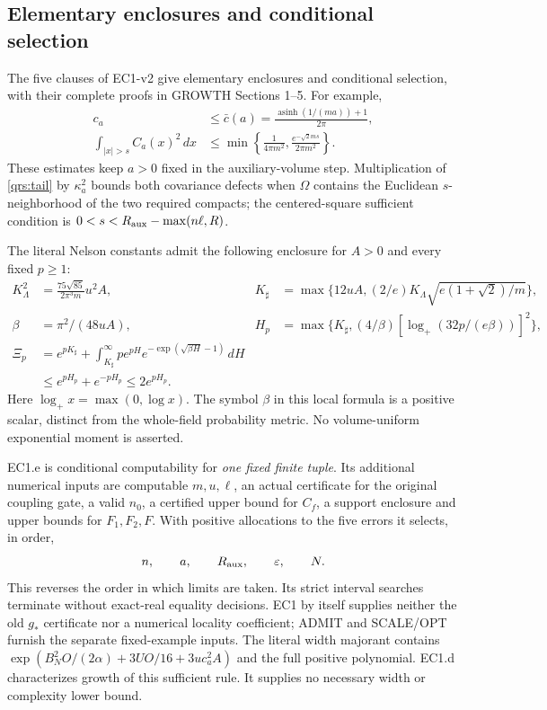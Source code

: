 \documentclass[11pt]{article}
\theoremstyle{plain}
\theoremstyle{definition}
\theoremstyle{remark}
\begin{document}
\subsection{Elementary enclosures and conditional selection}
\label{qrs:effective}

The five clauses of EC1-v2 give elementary enclosures and conditional
selection, with their complete proofs in GROWTH Sections 1--5. For example,
\begin{align}
 c_a&\le\bar c(a)=\frac{\operatorname{asinh}(1/(ma))+1}{2\pi},
 \label{qrs:variance}\\
 \int_{|x|>s}C_a(x)^2\,dx
 &\le\min\left\{\frac1{4\pi m^2},
                  \frac{e^{-\sqrt2ms}}{2\pi m^2}\right\}.
 \label{qrs:tail}
\end{align}
These estimates keep $a>0$ fixed in the auxiliary-volume step.
Multiplication of \eqref{qrs:tail} by $\kappa_a^2$ bounds both covariance
defects when $\Omega$ contains the Euclidean $s$-neighborhood of the two
required compacts; the centered-square sufficient condition is
$0<s<R_{\rm aux}-\max(n\ell,R)$.

The literal Nelson constants admit the following enclosure for $A>0$ and
every fixed $p\ge1$:
\begin{align}
 K_\Lambda^2&=\frac{75\sqrt{85}}{2\pi^3m}u^2A,
 &K_\sharp&=\max\{12uA,(2/e)K_\Lambda\sqrt{e(1+\sqrt2)/m}\},\nonumber\\
 \beta&=\pi^2/(48uA),
 &H_p&=\max\{K_\sharp,(4/\beta)[\log_+(32p/(e\beta))]^2\},\nonumber\\
 \Xi_p&=e^{pK_\sharp}
    +\int_{K_\sharp}^\infty pe^{pH}
                    e^{-\exp(\sqrt{\beta H}-1)}\,dH\nonumber\\
 &\le e^{pH_p}+e^{-pH_p}\le2e^{pH_p}.
 \label{qrs:Nelson}
\end{align}
Here $\log_+x=\max(0,\log x)$. The symbol $\beta$ in this local formula
is a positive scalar, distinct from the whole-field probability metric.
No volume-uniform exponential moment is asserted.

EC1.e is conditional computability for \emph{one fixed finite tuple}.
Its additional numerical inputs are computable $m,u,\ell$, an actual
certificate for the original coupling gate, a valid $n_0$, a certified
upper bound for $C_f$, a support enclosure and upper bounds for $F_1,F_2,F$.
With positive allocations to the five errors it selects, in order,
\begin{equation}\label{qrs:selection-order}
 n,\qquad a,\qquad R_{\rm aux},\qquad\varepsilon,\qquad N.
\end{equation}
This reverses the order in which limits are taken. Its strict interval
searches terminate without exact-real equality decisions. EC1 by itself
supplies neither the old $g_*$ certificate nor a numerical locality
coefficient; ADMIT and SCALE/OPT furnish the separate fixed-example inputs.
The literal width majorant contains
$\exp(B_N^2O/(2\alpha)+3UO/16+3uc_a^2A)$ and the full positive polynomial.
EC1.d characterizes growth of this sufficient rule. It supplies no necessary
width or complexity lower bound.
\end{document}

